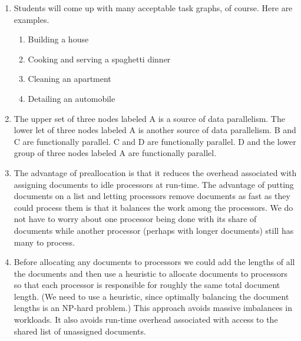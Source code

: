 \begin{enumerate}
\item Students will come up with many acceptable task graphs, of course.
      Here are examples.
      \vfill\eject

      \begin{enumerate}
      \item Building a house
      \begin{center}
      \end{center}
      \item Cooking and serving a spaghetti dinner
      \begin{center}
      \end{center}
      \item Cleaning an apartment
      \begin{center}
      \end{center}
      \item Detailing an automobile
      \begin{center}
      \end{center}
      \end{enumerate}

\item The upper set of three nodes labeled A is a source of data parallelism.
      The lower let of three nodes labeled A is another source of data
      parallelism. B and C are functionally parallel. C and D are
      functionally parallel. D and the lower group of three nodes labeled A
      are functionally parallel.

\item The advantage of preallocation is that it reduces the overhead
      associated with assigning documents to idle processors at run-time.
      The advantage of putting documents on a list and letting processors
      remove documents as fast as they could process them is that it
      balances the work among the processors. We do not have to worry about
      one processor being done with its share of documents while another
      processor (perhaps with longer documents) still has many to process.

\item Before allocating any documents to processors we could add the lengths
      of all the documents and then use a heuristic to allocate documents to
      processors so that each processor is responsible for roughly the same
      total document length. (We need to use a heuristic, since optimally
      balancing the document lengths is an NP-hard problem.)
      This approach avoids massive imbalances in workloads. It also avoids
      run-time overhead associated with access to the shared list of
      unassigned documents.
\end{enumerate}


